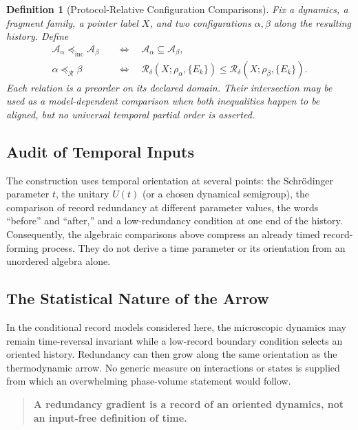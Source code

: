\documentclass[12pt,a4paper]{article}
\newtheorem{definition}[theorem]{Definition}
\begin{document}
\begin{definition}[Protocol-Relative Configuration Comparisons]
\label{def:ordering}
Fix a dynamics, a fragment family, a pointer label $X$, and two configurations $\alpha,\beta$ along the resulting history.  Define
\begin{equation}
\begin{aligned}
\mathcal{A}_\alpha \preceq_{\mathrm{inc}} \mathcal{A}_\beta
&\quad\Longleftrightarrow\quad
\mathcal{A}_\alpha\subseteq\mathcal{A}_\beta,\\
\alpha\preceq_{\mathcal R}\beta
&\quad\Longleftrightarrow\quad
\mathcal R_\delta(X;\rho_\alpha,\{E_k\})
\leq \mathcal R_\delta(X;\rho_\beta,\{E_k\}).
\end{aligned}
\end{equation}
Each relation is a preorder on its declared domain.  Their intersection may be used as a model-dependent comparison when both inequalities happen to be aligned, but no universal temporal partial order is asserted.
\end{definition}

\subsection{Audit of Temporal Inputs}

The construction uses temporal orientation at several points: the Schr\"odinger parameter $t$, the unitary $U(t)$ (or a chosen dynamical semigroup), the comparison of record redundancy at different parameter values, the words ``before'' and ``after,'' and a low-redundancy condition at one end of the history.  Consequently, the algebraic comparisons above compress an already timed record-forming process.  They do not derive a time parameter or its orientation from an unordered algebra alone.

\subsection{The Statistical Nature of the Arrow}

In the conditional record models considered here, the microscopic dynamics may remain time-reversal invariant while a low-record boundary condition selects an oriented history.  Redundancy can then grow along the same orientation as the thermodynamic arrow.  No generic measure on interactions or states is supplied from which an overwhelming phase-volume statement would follow.

\begin{quote}
\textbf{A redundancy gradient is a record of an oriented dynamics, not an input-free definition of time.}
\end{quote}
\end{document}
